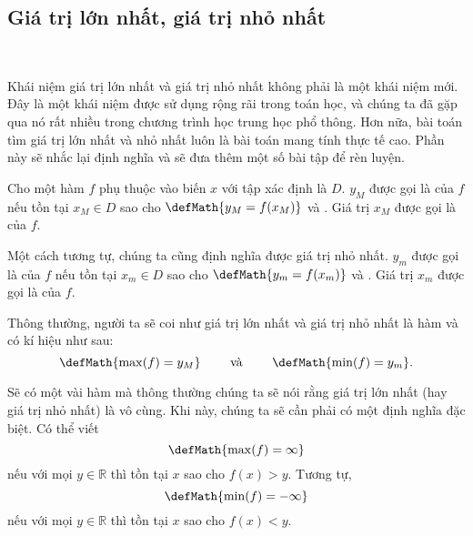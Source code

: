 \subsection{Giá trị lớn nhất, giá trị nhỏ nhất}

\ %

Khái niệm giá trị lớn nhất và giá trị nhỏ nhất không phải là một khái niệm mới. Đây là một khái niệm được sử dụng rộng rãi trong toán học, và chúng ta đã gặp qua nó rất nhiều trong chương trình học trung học phổ thông. Hơn nữa, bài toán tìm giá trị lớn nhất và nhỏ nhất luôn là bài toán mang tính thực tế cao. Phần này sẽ nhắc lại định nghĩa và sẽ đưa thêm một số bài tập để rèn luyện.

Cho một hàm $f$ phụ thuộc vào biến $x$ với tập xác định là $D$. $y_M$ được gọi là  của $f$ nếu tồn tại $x_M \in D$ sao cho $\defMath{y_M = f(x_M)}$ và . Giá trị $x_M$ được gọi là  của $f$. 

Một cách tương tự, chúng ta cũng định nghĩa được giá trị nhỏ nhất. $y_m$ được gọi là  của $f$ nếu tồn tại $x_m \in D$ sao cho $\defMath{y_m = f(x_m)}$ và . Giá trị $x_m$ được gọi là  của $f$.

Thông thường, người ta sẽ coi như giá trị lớn nhất và giá trị nhỏ nhất là hàm và có kí hiệu như sau:
$$
\defMath{\max (f) = y_M}
\qquad \text{ và } \qquad
\defMath{\min (f) = y_m}.
$$

Sẽ có một vài hàm mà thông thường chúng ta sẽ nói rằng giá trị lớn nhất (hay giá trị nhỏ nhất) là vô cùng. Khi này, chúng ta sẽ cần phải có một định nghĩa đặc biệt. Có thể viết $$\defMath{\max (f) = \infty}$$ nếu với mọi $y \in \mathbb{R}$ thì tồn tại $x$ sao cho $f(x) > y$. Tương tự, $$\defMath{\min (f) = -\infty}$$ nếu với mọi $y \in \mathbb{R}$ thì tồn tại $x$ sao cho $f(x) < y$.
